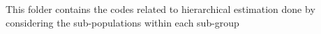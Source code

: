 This folder contains the codes related to hierarchical estimation done by considering the sub-populations within each sub-group 
